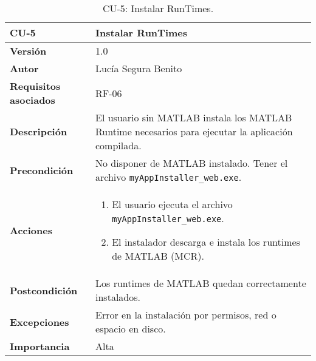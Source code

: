 \begin{table}[H]
\centering
\begin{tabular}{|p{3cm}|p{9cm}|}
\hline
\textbf{CU-5} & \textbf{Instalar RunTimes} \\
\hline
\textbf{Versión} & 1.0 \\
\hline
\textbf{Autor} & Lucía Segura Benito \\
\hline
\textbf{Requisitos asociados} & RF-06 \\
\hline
\textbf{Descripción} & El usuario sin MATLAB instala los MATLAB Runtime necesarios para ejecutar la aplicación compilada. \\
\hline
\textbf{Precondición} & No disponer de MATLAB instalado. Tener el archivo \texttt{myAppInstaller\_web.exe}. \\
\hline
\textbf{Acciones} &
\begin{enumerate}
    \item El usuario ejecuta el archivo \texttt{myAppInstaller\_web.exe}.
    \item El instalador descarga e instala los runtimes de MATLAB (MCR).
\end{enumerate}
\\
\hline
\textbf{Postcondición} & Los runtimes de MATLAB quedan correctamente instalados. \\
\hline
\textbf{Excepciones} & Error en la instalación por permisos, red o espacio en disco. \\
\hline
\textbf{Importancia} & Alta \\
\hline
\end{tabular}
\caption{CU-5: Instalar RunTimes.}
\label{tab:cu5}
\end{table}




